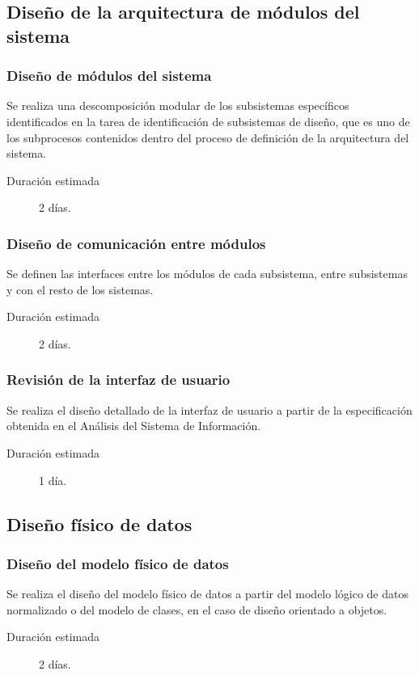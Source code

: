 \documentclass[11pt,a4paper,spanish,twoside]{report}
\begin{document}
\subsection{Diseño de la arquitectura de módulos del sistema}
\subsubsection{Diseño de módulos del sistema}
Se realiza una descomposición modular de los subsistemas específicos
identificados en la tarea de identificación de subsistemas de diseño, que es
uno de los subprocesos contenidos dentro del proceso de definición de la
arquitectura del sistema. 
\begin{description}
\item[Duración estimada] 2 días.
\end{description}

\subsubsection{Diseño de comunicación entre módulos}
Se definen las interfaces entre los módulos de cada subsistema, entre
subsistemas y con el resto de los sistemas. 
\begin{description}
\item[Duración estimada] 2 días.
\end{description}

\subsubsection{Revisión de la interfaz de usuario}
Se realiza el diseño detallado de la interfaz de usuario a partir de la
especificación obtenida en el Análisis del Sistema de Información. 
\begin{description}
\item[Duración estimada] 1 día.
\end{description}

\subsection{Diseño físico de datos}
\subsubsection{Diseño del modelo físico de datos}
Se realiza el diseño del modelo físico de datos a partir del modelo lógico de
datos normalizado o del modelo de clases, en el caso de diseño orientado a
objetos. 
\begin{description}
\item[Duración estimada] 2 días.
\end{description}
\end{document}
